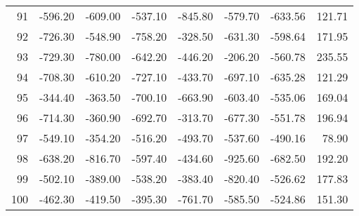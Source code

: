 \begin{longtable}{rrrrrrrr}
91 & -596.20 & -609.00 & -537.10 & -845.80 & -579.70 & -633.56 & 121.71  \\
92 & -726.30 & -548.90 & -758.20 & -328.50 & -631.30 & -598.64 & 171.95  \\
93 & -729.30 & -780.00 & -642.20 & -446.20 & -206.20 & -560.78 & 235.55  \\
94 & -708.30 & -610.20 & -727.10 & -433.70 & -697.10 & -635.28 & 121.29  \\
95 & -344.40 & -363.50 & -700.10 & -663.90 & -603.40 & -535.06 & 169.04  \\
96 & -714.30 & -360.90 & -692.70 & -313.70 & -677.30 & -551.78 & 196.94  \\
97 & -549.10 & -354.20 & -516.20 & -493.70 & -537.60 & -490.16 & 78.90  \\
98 & -638.20 & -816.70 & -597.40 & -434.60 & -925.60 & -682.50 & 192.20  \\
99 & -502.10 & -389.00 & -538.20 & -383.40 & -820.40 & -526.62 & 177.83  \\
100 & -462.30 & -419.50 & -395.30 & -761.70 & -585.50 & -524.86 & 151.30  \\

\end{longtable}


